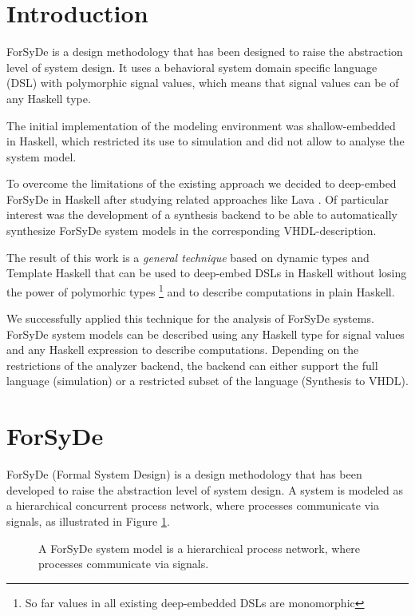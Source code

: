 
\section{Introduction}
\label{sec:Introduction}

ForSyDe is a design methodology that has been designed to raise the abstraction level of system design. It uses a behavioral system domain specific language (DSL) with polymorphic signal values, which means that signal values can be of any Haskell type.

The initial implementation of the modeling environment was shallow-embedded in Haskell, which restricted its use to simulation and did not allow to analyse the system model. 

To overcome the limitations of the existing approach we decided to deep-embed ForSyDe in Haskell after studying related approaches like Lava \cite{BjeCla1998}. Of particular interest was the development of a synthesis backend to be able to automatically synthesize ForSyDe system models in the corresponding VHDL-description. 

The result of this work is a \emph{general technique} based on dynamic types and Template Haskell \cite{} that can be used to deep-embed DSLs in Haskell without losing the power of polymorhic types \footnote{So far values in all existing deep-embedded DSLs are monomorphic} and to describe computations in plain Haskell.
 
We successfully applied this technique for the analysis of ForSyDe systems. ForSyDe system models can be described using any Haskell type for signal values and any Haskell expression to describe computations. Depending on the restrictions of the analyzer backend, the backend can either support the full language (simulation) or a restricted subset of the language (Synthesis to VHDL). 

\section{ForSyDe}
\label{sec:ForSyDe}

ForSyDe (Formal System Design) \cite{SanJan2004a} is a design methodology that has been developed to raise the abstraction level of system design. A system is modeled as a hierarchical concurrent process network, where processes communicate via signals, as illustrated in Figure \ref{fig:SystemModel}.

\begin{figure}[htb]
  \centering
  \resizebox{0.4\columnwidth}{!}{}
  \caption{A ForSyDe system model is a hierarchical process network, where processes communicate via signals.}
  \label{fig:SystemModel}
\end{figure}

